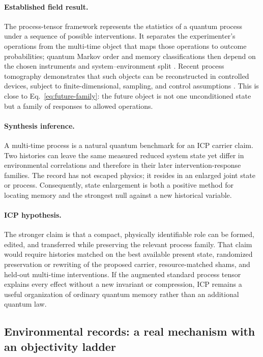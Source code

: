 \paragraph{Established field result.}
The process-tensor framework represents the statistics of a quantum process
under a sequence of possible interventions.  It separates the experimenter's
operations from the multi-time object that maps those operations to outcome
probabilities; quantum Markov order and memory classifications then depend on
the chosen instruments and system--environment split
\citep{PollockEtAl2018ProcessTensor,PollockEtAl2018Markov,
TarantoEtAl2019MarkovOrder,TarantoEtAl2024ClassicalMemory}.  Recent process
tomography demonstrates that such objects can be reconstructed in controlled
devices, subject to finite-dimensional, sampling, and control assumptions
\citep{GiarmatziEtAl2025Tomography}.  This is close to
Eq.~\eqref{eq:future-family}: the future object is not one unconditioned state
but a family of responses to allowed operations.

\paragraph{Synthesis inference.}
A multi-time process is a natural quantum benchmark for an ICP carrier claim.
Two histories can leave the same measured reduced system state yet differ in
environmental correlations and therefore in their later intervention-response
families.  The record has not escaped physics; it resides in an enlarged joint
state or process.  Consequently, state enlargement is both a positive method
for locating memory and the strongest null against a new historical variable.

\paragraph{ICP hypothesis.}
The stronger claim is that a compact, physically identifiable role can be
formed, edited, and transferred while preserving the relevant process family.
That claim would require histories matched on the best available present state,
randomized preservation or rewriting of the proposed carrier, resource-matched
shams, and held-out multi-time interventions.  If the augmented standard
process tensor explains every effect without a new invariant or compression,
ICP remains a useful organization of ordinary quantum memory rather than an
additional quantum law.

\subsection{Environmental records: a real mechanism with an objectivity ladder}

